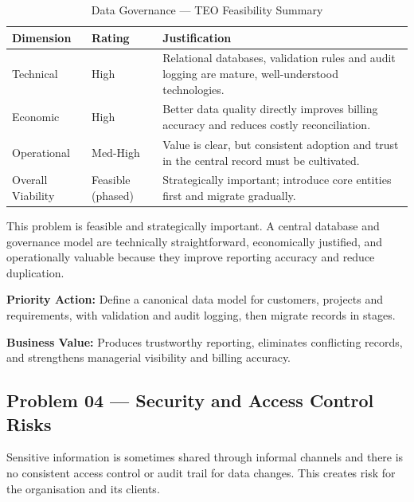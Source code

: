 \documentclass[12pt,a4paper]{report}
\begin{document}
\begin{table}[H]
\centering
\renewcommand{\arraystretch}{1.3}
\begin{tabularx}{\textwidth}{|p{3cm}|p{2.5cm}|X|}
\hline
\rowcolor{secondary}
\textbf{Dimension} & \textbf{Rating} & \textbf{Justification} \\
\hline
Technical & High & Relational databases, validation rules and audit logging are mature, well-understood technologies. \\
\hline
Economic & High & Better data quality directly improves billing accuracy and reduces costly reconciliation. \\
\hline
Operational & Med-High & Value is clear, but consistent adoption and trust in the central record must be cultivated. \\
\hline
Overall Viability & Feasible (phased) & Strategically important; introduce core entities first and migrate gradually. \\
\hline
\end{tabularx}
\caption{Data Governance --- TEO Feasibility Summary}
\end{table}

\begin{summaryBox}
This problem is feasible and strategically important. A central database and governance model are technically straightforward, economically justified, and operationally valuable because they improve reporting accuracy and reduce duplication.
\end{summaryBox}

\begin{recommendBox}
\textbf{Priority Action:} Define a canonical data model for customers, projects and requirements, with validation and audit logging, then migrate records in stages.

\textbf{Business Value:} Produces trustworthy reporting, eliminates conflicting records, and strengthens managerial visibility and billing accuracy.
\end{recommendBox}

\subsection{Problem 04 --- Security and Access Control Risks}

\begin{problemBox}
Sensitive information is sometimes shared through informal channels and there is no consistent access control or audit trail for data changes. This creates risk for the organisation and its clients.
\end{problemBox}
\end{document}
